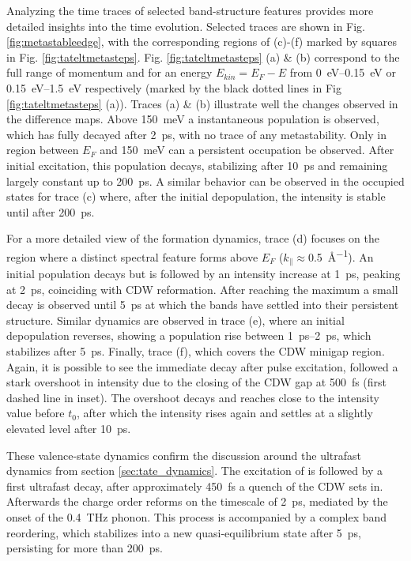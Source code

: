 Analyzing the time traces of selected band-structure features provides more detailed insights into the time evolution.
Selected traces are shown in Fig. \ref{fig:metastableedge}, with the corresponding regions of (c)-(f) marked by squares in Fig. \ref{fig:tateltmetasteps}.
Fig. \ref{fig:tateltmetasteps} (a) \& (b) correspond to the full range of momentum and for an energy $E_{kin}=E_F-E$ from \qtyrange{0}{0.15}{\electronvolt} or \qtyrange{0.15}{1.5}{\electronvolt} respectively (marked by the black dotted lines in Fig \ref{fig:tateltmetasteps} (a)).
Traces (a) \& (b) illustrate well the changes observed in the difference maps.
Above \qty{150}{\milli\electronvolt} a instantaneous population is observed, which has fully decayed after \qty{2}{\pico\second}, with no trace of any metastability.
Only in region between $E_F$ and \qty{150}{\milli\electronvolt} can a persistent occupation be observed.
After initial excitation, this population decays, stabilizing after \qty{10}{\pico\second} and remaining largely constant up to \qty{200}{\pico\second}.
A similar behavior can be observed in the occupied states for trace (c) where, after the initial depopulation, the intensity is stable until after \qty{200}{\pico\second}.

For a more detailed view of the formation dynamics, trace (d) focuses on the region where a distinct spectral feature forms above $E_F$ ($k_\parallel\approx$\qty{0.5}{\angstrom^{-1}}).
An initial population decays but is followed by an intensity increase at \qty{1}{\pico\second}, peaking at \qty{2}{\pico\second}, coinciding with CDW reformation.
After reaching the maximum a small decay is observed until \qty{5}{\pico\second} at which the bands have settled into their persistent structure.
Similar dynamics are observed in trace (e), where an initial depopulation reverses, showing a population rise between \qtyrange{1}{2}{\pico\second}, which stabilizes after \qty{5}{\pico\second}.
Finally, trace (f), which covers the CDW minigap region.
Again, it is possible to see the immediate decay after pulse excitation, followed a stark overshoot in intensity due to the closing of the CDW gap at \qty{500}{\femto\second} (first dashed line in inset).
The overshoot decays and reaches close to the intensity value before $t_0$, after which the intensity rises again and settles at a slightly elevated level after \qty{10}{\pico\second}.

These valence-state dynamics confirm the discussion around the ultrafast dynamics from section \ref{sec:tate_dynamics}.
The excitation of  is followed by a first ultrafast decay, after approximately \qty{450}{\femto\second} a quench of the CDW sets in.
Afterwards the charge order reforms on the timescale of \qty{2}{\pico\second}, mediated by the onset of the \qty{0.4}{\tera\hertz} phonon.
This process is accompanied by a complex band reordering, which stabilizes into a new quasi-equilibrium state after \qty{5}{\pico\second}, persisting for more than \qty{200}{\pico\second}.


